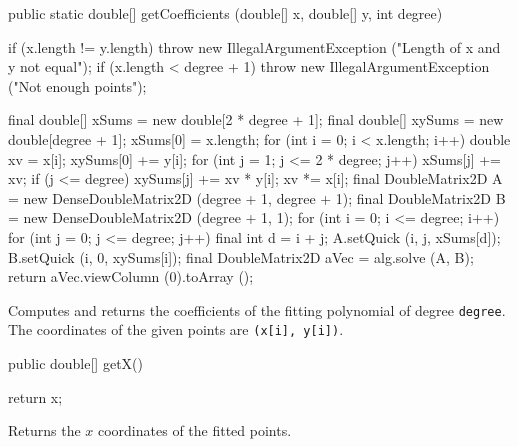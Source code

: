 \begin{code}

   public static double[] getCoefficients (double[] x, double[] y,
                                           int degree)\begin{hide} {
      if (x.length != y.length)
         throw new IllegalArgumentException ("Length of x and y not equal");
      if (x.length < degree + 1)
         throw new IllegalArgumentException ("Not enough points");

      final double[] xSums = new double[2 * degree + 1];
      final double[] xySums = new double[degree + 1];
      xSums[0] = x.length;
      for (int i = 0; i < x.length; i++) {
         double xv = x[i];
         xySums[0] += y[i];
         for (int j = 1; j <= 2 * degree; j++) {
            xSums[j] += xv;
            if (j <= degree)
               xySums[j] += xv * y[i];
            xv *= x[i];
         }
      }
      final DoubleMatrix2D A = new DenseDoubleMatrix2D (degree + 1, degree + 1);
      final DoubleMatrix2D B = new DenseDoubleMatrix2D (degree + 1, 1);
      for (int i = 0; i <= degree; i++) {
         for (int j = 0; j <= degree; j++) {
            final int d = i + j;
            A.setQuick (i, j, xSums[d]);
         }
         B.setQuick (i, 0, xySums[i]);
      }
      final DoubleMatrix2D aVec = alg.solve (A, B);
      return aVec.viewColumn (0).toArray ();
   }\end{hide}
\end{code}
\begin{tabb} Computes and returns the coefficients of the fitting polynomial of
  degree \texttt{degree}.
 The coordinates of the given points are  \texttt{(x[i], y[i])}.
\end{tabb}
\begin{htmlonly}
\end{htmlonly}
\begin{code}

   public double[] getX()\begin{hide} {
      return x;
   }\end{hide}
\end{code}
\begin{tabb}   Returns the $x$ coordinates of the fitted points.
\end{tabb}
\begin{htmlonly}
\end{htmlonly}
